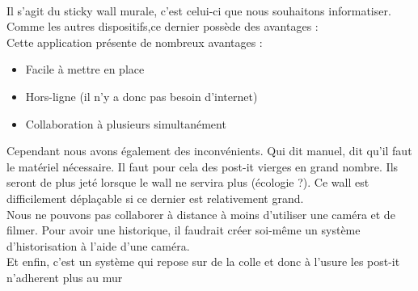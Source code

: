 \documentclass{article}
\begin{document}
\vspace{0.2cm}\\
Il s'agit du sticky wall murale, c'est celui-ci que nous souhaitons informatiser. Comme les autres dispositifs,ce dernier possède des avantages :
\vspace{0.2cm}\\
Cette application présente de nombreux avantages :
\begin{itemize}
  \item Facile à mettre en place
  \item Hors-ligne (il n'y a donc pas besoin d'internet)
  \item Collaboration à plusieurs simultanément
\end{itemize}
\vspace{0.2cm}
\hspace*{0.6cm}Cependant nous avons également des inconvénients. Qui dit manuel, dit qu'il faut le matériel nécessaire. Il faut pour cela des post-it vierges en grand nombre. Ils seront de plus jeté lorsque le wall ne servira plus (écologie ?). Ce wall est difficilement déplaçable si ce dernier est relativement grand. \\Nous ne pouvons pas collaborer à distance à moins d'utiliser une caméra et de filmer. Pour avoir une historique, il faudrait créer soi-même un système d'historisation à l'aide d'une caméra. \\Et enfin, c'est un système qui repose sur de la colle et donc à l'usure les post-it n'adherent plus au mur
\end{document}
